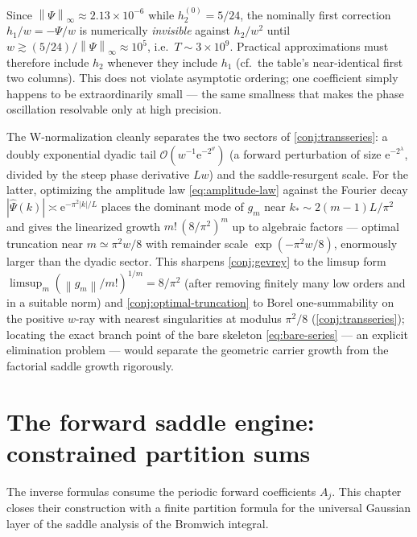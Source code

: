 \documentclass[11pt,oneside]{article}
\numberwithin{equation}{section}
\theoremstyle{definition}
\theoremstyle{remark}
\newcommand{\e}{\mathrm e}
\newcommand{\bigO}{\mathcal O}
\newcommand{\abs}[1]{\left\lvert #1\right\rvert}
\newcommand{\norm}[1]{\left\lVert #1\right\rVert}
\newcommand{\Psihat}{\widehat\Psi}
\begin{document}
\begin{remark}
Since $\norm{\Psi}_\infty\approx2.13\times10^{-6}$ while
$h_2^{(0)}=5/24$, the nominally first correction $h_1/w=-\Psi/w$ is
numerically \emph{invisible} against $h_2/w^{2}$ until
$w\gtrsim(5/24)/\norm{\Psi}_\infty\approx10^{5}$, i.e.\
$T\sim3\times10^{9}$.  Practical approximations must therefore
include $h_2$ whenever they include $h_1$
(cf.\ the table's near-identical first two columns).  This does not
violate asymptotic ordering; one coefficient simply happens to be
extraordinarily small --- the same smallness that makes the phase
oscillation resolvable only at high precision.
\end{remark}

\begin{remark}
The W-normalization cleanly separates the two sectors of
\cref{conj:transseries}: a doubly exponential dyadic tail
$\bigO(w^{-1}\e^{-2^{\vartheta}})$ (a forward perturbation of size
$\e^{-2^{\lambda}}$, divided by the steep phase derivative $Lw$) and
the saddle-resurgent scale.  For the latter, optimizing the
amplitude law \eqref{eq:amplitude-law} against the Fourier decay
$\abs{\Psihat(k)}\asymp\e^{-\pi^{2}\abs k/L}$ places the dominant
mode of $g_m$ near $k_*\sim2(m-1)L/\pi^{2}$ and gives the linearized
growth $m!\,(8/\pi^{2})^{m}$ up to algebraic factors --- optimal
truncation near $m\simeq\pi^{2}w/8$ with remainder scale
$\exp(-\pi^{2}w/8)$, enormously larger than the dyadic sector.  This
sharpens \cref{conj:gevrey} to the limsup form
$\limsup_m(\norm{g_m}/m!)^{1/m}=8/\pi^{2}$ (after removing finitely
many low orders and in a suitable norm) and
\cref{conj:optimal-truncation} to Borel one-summability on the
positive $w$-ray with nearest singularities at modulus
$\pi^{2}/8$ (\cref{conj:transseries}); locating the exact branch
point of the bare skeleton \eqref{eq:bare-series} --- an explicit
elimination problem --- would separate the geometric carrier growth
from the factorial saddle growth rigorously.
\end{remark}

\section{The forward saddle engine: constrained partition sums}
\label{sec:saddle}

The inverse formulas consume the periodic forward coefficients
$A_j$.  This chapter closes their construction with a finite
partition formula for the universal Gaussian layer of the saddle
analysis of the Bromwich integral.
\end{document}

